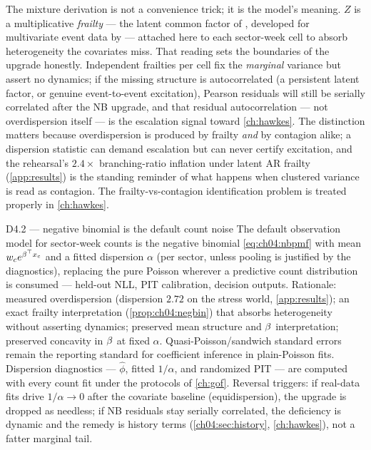 The mixture derivation is not a convenience trick; it is the model's
meaning. $Z$ is a multiplicative \emph{frailty} --- the latent common
factor of \citet{vaupel1979}, developed for multivariate event data by
\citet{hougaard2000} --- attached here to each sector-week cell to absorb
heterogeneity the covariates miss. That reading sets the boundaries of
the upgrade honestly. Independent frailties per cell fix the
\emph{marginal} variance but assert no dynamics; if the missing structure
is autocorrelated (a persistent latent factor, or genuine
event-to-event excitation), Pearson residuals will still be serially
correlated after the NB upgrade, and that residual autocorrelation ---
not overdispersion itself --- is the escalation signal toward
\cref{ch:hawkes}. The distinction matters because overdispersion is
produced by frailty \emph{and} by contagion alike; a dispersion
statistic can demand escalation but can never certify excitation, and
the rehearsal's $2.4\times$ branching-ratio inflation under latent
AR frailty (\cref{app:results}) is the standing reminder of what happens
when clustered variance is read as contagion. The frailty-vs-contagion
identification problem is treated properly in \cref{ch:hawkes}.

\begin{decision}{D4.2 --- negative binomial is the default count noise}
The default observation model for sector-week counts is the negative
binomial \cref{eq:ch04:nbpmf} with mean $w_c e^{\beta^{\top}x_c}$ and a
fitted dispersion $\alpha$ (per sector, unless pooling is justified by
the diagnostics), replacing the pure Poisson wherever a predictive count
distribution is consumed --- held-out NLL, PIT calibration, decision
outputs. Rationale: measured overdispersion (dispersion $2.72$ on the
stress world, \cref{app:results}); an exact frailty interpretation
(\cref{prop:ch04:negbin}) that absorbs heterogeneity without asserting
dynamics; preserved mean structure and $\beta$ interpretation;
preserved concavity in $\beta$ at fixed $\alpha$. Quasi-Poisson/sandwich
standard errors remain the reporting standard for coefficient inference
in plain-Poisson fits. Dispersion diagnostics --- $\hat\phi$, fitted
$1/\alpha$, and randomized PIT --- are computed with every count fit
under the protocols of \cref{ch:gof}. Reversal triggers: if real-data
fits drive $1/\alpha \to 0$ after the covariate baseline (equidispersion),
the upgrade is dropped as needless; if NB residuals stay serially
correlated, the deficiency is dynamic and the remedy is history terms
(\cref{ch04:sec:history}, \cref{ch:hawkes}), not a fatter marginal tail.
\end{decision}


